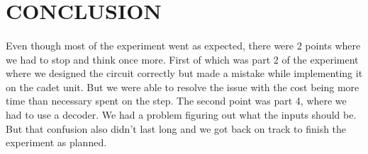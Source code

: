 \documentclass[pdftex,12pt,a4paper]{article}
\begin{document}
\section{CONCLUSION}
\begin{flushleft}
\paragraph{}
Even though most of the experiment went as expected, there were 2 points where we had to stop and think once more. First of which was part 2 of the experiment where we designed the circuit correctly but made a mistake while implementing it on the cadet unit. But we were able to resolve the issue with the cost being more time than necessary spent on the step. The second point was part 4, where we had to use a decoder. We had a problem figuring out what the inputs should be. But that confusion also didn't last long and we got back on track to finish the experiment as planned.

\end{flushleft}
\newpage


\nocite{overleaf}
\nocite{reportGuide}





\end{document}
